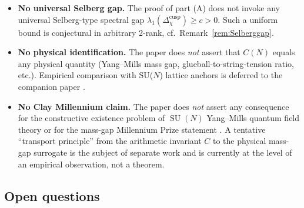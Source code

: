 \documentclass[11pt,a4paper,reqno]{amsart}
\theoremstyle{definition}
\DeclareMathOperator{\SU}{SU}
\newcommand{\Cinv}{C}
\begin{document}
\begin{itemize}[leftmargin=2em]
  \item \textbf{No universal Selberg gap.} The proof of part (A) does not
        invoke any universal Selberg-type spectral gap
        $\lambda_1(\Delta_\chi^{\mathrm{cusp}})\ge c>0$.  Such a uniform
        bound is conjectural in arbitrary 2-rank, cf.\
        Remark~\ref{rem:Selberggap}.
  \item \textbf{No physical identification.} The paper does \emph{not}
        assert that $\Cinv(N)$ equals any physical quantity (Yang--Mills
        mass gap, glueball-to-string-tension ratio, etc.).  Empirical
        comparison with SU($N$) lattice anchors \cite{Athenodorou2021} is
        deferred to the companion paper \cite{Remondiere2026Transport}.
  \item \textbf{No Clay Millennium claim.} The paper does \emph{not} assert
        any consequence for the constructive existence problem of
        $\SU(N)$ Yang--Mills quantum field theory or for the mass-gap
        Millennium Prize statement \cite{Remondiere2026Survey}.  A tentative
        ``transport principle'' from the arithmetic invariant $\Cinv$ to
        the physical mass-gap surrogate is the subject of separate work and
        is currently at the level of an empirical observation, not a
        theorem.
\end{itemize}

\subsection{Open questions}\label{ss:openQ}
\end{document}
